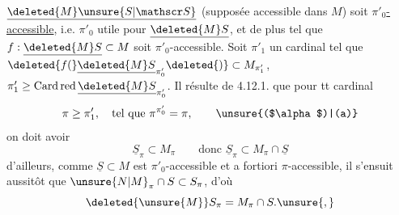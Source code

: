 $\underline{\deleted{M}\unsure{S|\mathscr S}}$ (supposée accessible dans $M$) soit
\uline{$\pi'_0$-accessible}, i.e. $\pi'_0$ utile pour $\underline{\deleted{M}S}$, et
de plus tel que $f:\underline{\deleted{M}S}\subset M$ soit $\pi'_0$-accessible.
 Soit $\pi'_1$  un cardinal tel que
$\deleted{f(}\underline{\deleted{M}S}_{\pi'_0}\deleted{)}\subset M_{\pi'_1}$, $\pi'_1\geq\operatorname{Card\,red}\underline{\deleted{M}S}_{\pi'_0}$.
Il résulte de
4.12.1. que pour tt cardinal
\[
 \pi\geq\pi'_1,\quad\text{tel que }\pi^{\pi'_0}=\pi,\tag*{\unsure{($\alpha$)|(a)}}
\]
on doit avoir
\[
 \underline S_\pi\subset M_\pi\qquad\text{donc }\underline S_\pi\subset M_\pi\cap\underline S
\]
d'ailleurs, comme $\underline S\subset M$ est $\pi'_0$-accessible
et a fortiori $\pi$-accessible,  il s'ensuit
aussitôt que $\unsure{N|M}_\pi\cap S\subset S_\pi$, d'où\unsure{:}
\[
 \deleted{\unsure{M}}S_\pi=M_\pi\cap S.\unsure{,}
\]

